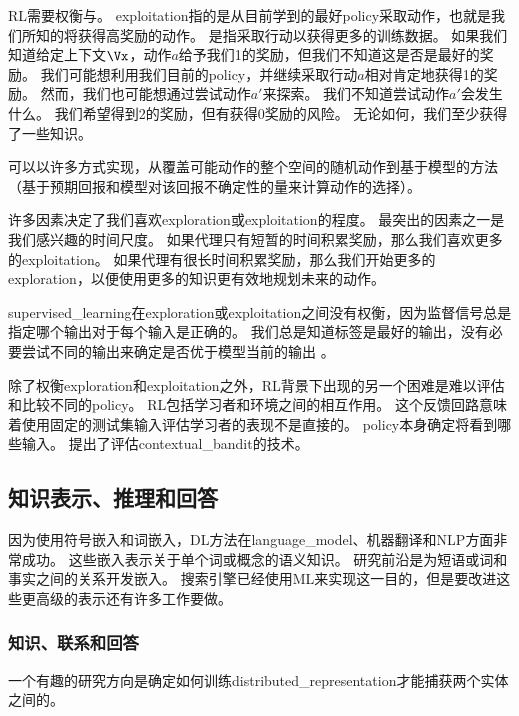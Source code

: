 
\gls{RL}需要权衡与。
\gls{exploitation}指的是从目前学到的最好\gls{policy}采取动作，也就是我们所知的将获得高奖励的动作。
是指采取行动以获得更多的训练数据。
如果我们知道给定上下文$\Vx$，动作$a$给予我们1的奖励，但我们不知道这是否是最好的奖励。
我们可能想利用我们目前的\gls{policy}，并继续采取行动$a$相对肯定地获得1的奖励。
然而，我们也可能想通过尝试动作$a'$来探索。
我们不知道尝试动作$a'$会发生什么。
我们希望得到2的奖励，但有获得0奖励的风险。
无论如何，我们至少获得了一些知识。

可以以许多方式实现，从覆盖可能动作的整个空间的随机动作到基于模型的方法（基于预期回报和模型对该回报不确定性的量来计算动作的选择）。

许多因素决定了我们喜欢\gls{exploration}或\gls{exploitation}的程度。
最突出的因素之一是我们感兴趣的时间尺度。
如果代理只有短暂的时间积累奖励，那么我们喜欢更多的\gls{exploitation}。
如果代理有很长时间积累奖励，那么我们开始更多的\gls{exploration}，以便使用更多的知识更有效地规划未来的动作。

\gls{supervised_learning}在\gls{exploration}或\gls{exploitation}之间没有权衡，因为监督信号总是指定哪个输出对于每个输入是正确的。
我们总是知道标签是最好的输出，没有必要尝试不同的输出来确定是否优于模型当前的输出 。

除了权衡\gls{exploration}和\gls{exploitation}之外，\gls{RL}背景下出现的另一个困难是难以评估和比较不同的\gls{policy}。
\gls{RL}包括学习者和环境之间的相互作用。
这个反馈回路意味着使用固定的测试集输入评估学习者的表现不是直接的。
\gls{policy}本身确定将看到哪些输入。
\citet{Dudik-2011} 提出了评估\gls{contextual_bandit}的技术。


\subsection{知识表示、推理和回答}
\label{sec:knowledge_representation_reasoning and_question_answering}
因为使用符号嵌入\citep{Rumelhart86b-small}和词嵌入\citep{Deerwester90,BenDucVin01-small}，\gls{DL}方法在\gls{language_model}、机器翻译和\gls{NLP}方面非常成功。
这些嵌入表示关于单个词或概念的语义知识。
研究前沿是为短语或词和事实之间的关系开发嵌入。
搜索引擎已经使用\gls{ML}来实现这一目的，但是要改进这些更高级的表示还有许多工作要做。

\subsubsection{知识、联系和回答}
一个有趣的研究方向是确定如何训练\gls{distributed_representation}才能捕获两个实体之间的。

